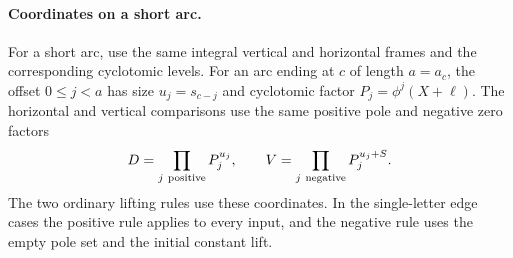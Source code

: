 \paragraph{Coordinates on a short arc.}\label{par:short-wach-frame}
\begin{proposition}\label{prop:short-arc-coordinates}
For a short arc, use the same integral vertical and
horizontal frames and the corresponding cyclotomic levels.
For an arc ending at \(c\) of length \(a=a_c\), the offset \(0\le j<a\)
has size \(u_j=s_{c-j}\) and cyclotomic factor \(P_j=\phi^j(X+\ell)\). The horizontal and vertical comparisons use the same positive pole and negative zero factors
\[
 D=\prod_{j\ {\rm positive}}P_j^{u_j},\qquad V=\prod_{j\ {\rm negative}}P_j^{u_j+S}.
\]
The two ordinary lifting rules use these coordinates. In the single-letter edge cases the
positive rule applies to every input, and the negative rule
uses the empty pole set and the initial constant lift.
\end{proposition}

